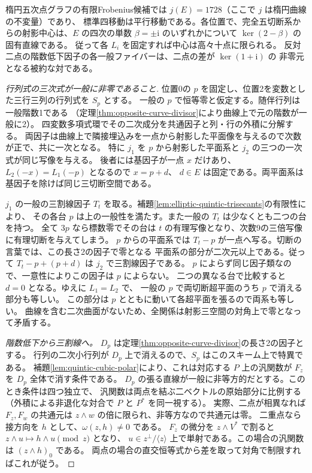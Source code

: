 \begin{theorem}\label{thm:elliptic-quintic-centers}
楕円五次点グラフの有限Frobenius候補では $j(E)=1728$（ここで $j$ は楕円曲線の不変量）であり、
標準四移動は平行移動である。各位置で、完全五切断系からの射影中心は、$E$ の四次の単数
$\beta=\pm\mathrm i$ のいずれかについて $\ker(2-\beta)$ の固有直線である。
従って各 $L_i$ を固定すれば中心は高々十点に限られる。
反対二点の階数低下因子の各一般ファイバーは、二点の差が $\ker(1+\mathrm i)$ の
非零元となる被約な対である。
\end{theorem}
\begin{proof}[行列式の三次式が一般に非零であること]
位置0の $p$ を固定し、位置2を変数とした三行三列の行列式を $S_p$ とする。
一般の $p$ で恒等零と仮定する。随伴行列は一般階数1である
（定理\ref{thm:opposite-curve-divisor}により曲線上で元の階数が一般に2）。
四変数多項式環でその二次成分を共通因子と列・行の外積に分解する。
両因子は曲線上で隣接埋込みを一点から射影した平面像を与えるので次数が正で、共に一次となる。
特に $j_1$ を $p$ から射影した平面系と $j_2$ の三つの一次式が同じ写像を与える。
後者には基因子が一点 $x$ だけあり、$L_2(-x)=L_1(-p)$ となるので $x=p+d$、
$d\in E$ は固定である。両平面系は基因子を除けば同じ三切断空間である。

$j_1$ の一般の三割線因子 $T_t$ を取る。補題\ref{lem:elliptic-quintic-trisecants}の有限性により、
その各台 $p$ は上の一般性を満たす。また一般の $T_t$ は少なくとも二つの台を持つ。
全て $3p$ なら標数零でその台は $t$ の有理写像となり、次数9の三倍写像に有理切断を与えてしまう。
$p$ からの平面系では $T_t-p$ が一点へ写る。切断の言葉では、この長さ2の因子で零となる
平面系の部分が二次元以上である。従って $T_t-p+(p+d)$ は $j_2$ で三割線因子である。
$p$ によらず同じ因子類なので、一意性によりこの因子は $p$ によらない。
二つの異なる台で比較すると $d=0$ となる。ゆえに $L_1=L_2$ で、
一般の $p$ で両切断超平面のうち $p$ で消える部分も等しい。
この部分は $p$ とともに動いて各超平面を張るので両系も等しい。
曲線を含む二次曲面がないため、全関係は射影三空間の対角上で零となって矛盾する。

\smallskip
\noindent\textit{階数低下から三割線へ。}
$D_p$ は定理\ref{thm:opposite-curve-divisor}の長さ2の因子とする。
行列の二次小行列が $D_p$ 上で消えるので、$S_p$ はこのスキーム上で特異である。
補題\ref{lem:quintic-cubic-polar}により、これは対応する $P$ 上の汎関数が $F_z$ を $D_p$ 全体で消す条件である。
$D_p$ の張る直線が一般に非等方的だとする。このとき条件は四つ独立で、
汎関数は両点を結ぶ二ベクトルの原始部分に比例する
（外積による非退化な対合で $P$ と $P^*$ を同一視する）。
実際、二点が相異なれば $F_z,F_w$ の共通元は $z\wedge w$ の倍に限られ、非等方なので共通元は零。
二重点なら接方向を $h$ として、$\omega(z,h)\ne0$ である。
$F_z$ の微分を $z\wedge V^*$ で割ると $z\wedge u\mapsto h\wedge u\pmod z$ となり、
$u\in z^\perp/\langle z\rangle$ 上で単射である。この場合の汎関数は $(z\wedge h)_0$ である。
両点の場合の直交恒等式から差を取って対角で制限すればこれが従う。


\end{proof}
